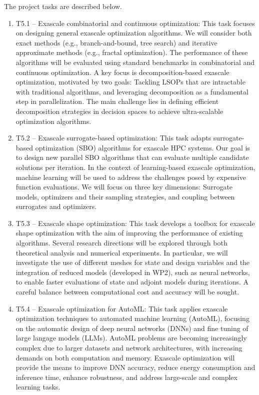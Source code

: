 The project tasks are described below.
\begin{enumerate}
\item T5.1 – Exascale combinatorial and continuous optimization: This task focuses on designing general exascale optimization algorithms. We will consider both exact methods (e.g., branch-and-bound, tree search) and iterative approximate methods (e.g., fractal optimization). The performance of these algorithms will be evaluated using standard benchmarks in combinatorial and continuous optimization. A key focus is decomposition-based exascale optimization, motivated by two goals: Tackling LSOPs that are intractable with traditional algorithms, and leveraging decomposition as a fundamental step in parallelization. The main challenge lies in defining efficient decomposition strategies in decision spaces to achieve ultra-scalable optimization algorithms.

 \item T5.2 – Exascale surrogate-based optimization: This task adapts surrogate-based optimization (SBO) algorithms for exascale HPC systems. Our goal is to design new parallel SBO algorithms that can evaluate multiple candidate solutions per iteration. In the context of learning-based exascale optimization, machine learning will be used to address the challenges posed by expensive function evaluations. We will focus on three key dimensions: Surrogate models, optimizers and their sampling strategies, and coupling between surrogates and optimizers.

 \item T5.3 – Exascale shape optimization: This task develops a toolbox for exascale shape optimization with the aim of improving the performance of existing algorithms. Several research directions will be explored through both theoretical analysis and numerical experiments. In particular, we will investigate the use of different meshes for state and design variables and the integration of reduced models (developed in WP2), such as neural networks, to enable faster evaluations of state and adjoint models during iterations. A careful balance between computational cost and accuracy will be sought.

 \item T5.4 – Exascale optimization for AutoML:
This task applies exascale optimization techniques to automated machine learning (AutoML), focusing on the automatic design of deep neural networks (DNNs) and fine tuning of large langage models (LLMs). AutoML problems are becoming increasingly complex due to larger datasets and network architectures, with increasing demands on both computation and memory. Exascale optimization will provide the means to improve DNN accuracy, reduce energy consumption and inference time, enhance robustness, and address large-scale and complex learning tasks.
\end{enumerate}

